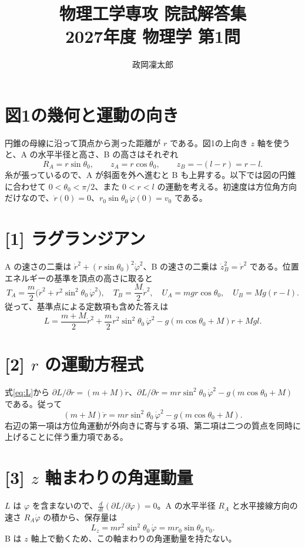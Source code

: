 \documentclass[11pt,a4paper]{article}
\title{物理工学専攻 院試解答集\\2027年度 物理学 第1問}
\author{政岡凜太郎}
\date{}
\begin{document}
\maketitle

\section*{図1の幾何と運動の向き}
円錐の母線に沿って頂点から測った距離が $r$ である。図1の上向き $z$ 軸を使うと、A の水平半径と高さ、B の高さはそれぞれ
\begin{equation}
 R_A=r\sin\theta_0,\qquad z_A=r\cos\theta_0,\qquad
 z_B=-(l-r)=r-l. \label{eq:geometry}
\end{equation}
糸が張っているので、A が斜面を外へ進むと B も上昇する。以下では図の円錐に合わせて $0<\theta_0<\pi/2$、また $0<r<l$ の運動を考える。初速度は方位角方向だけなので、$\dot r(0)=0$、$r_0\sin\theta_0\,\dot\varphi(0)=v_0$ である。

\section*{[1] ラグランジアン}
A の速さの二乗は $\dot r^{2}+(r\sin\theta_0)^2\dot\varphi^{2}$、B の速さの二乗は $\dot z_B^{2}=\dot r^{2}$ である。位置エネルギーの基準を頂点の高さに取ると
\[
 T_A=\frac m2\bigl(\dot r^{2}+r^2\sin^2\theta_0\,\dot\varphi^{2}\bigr),\quad
 T_B=\frac M2\dot r^{2},\quad
 U_A=mg r\cos\theta_0,\quad U_B=Mg(r-l).
\]
従って、基準点による定数項も含めた答えは
\begin{equation}
 \boxed{L=\frac{m+M}{2}\dot r^{2}
 +\frac m2r^2\sin^2\theta_0\,\dot\varphi^{2}
 -g(m\cos\theta_0+M)r+Mgl.} \label{eq:L}
\end{equation}

\section*{[2] $r$ の運動方程式}
式\eqref{eq:L}から $\partial L/\partial\dot r=(m+M)\dot r$、$\partial L/\partial r=mr\sin^2\theta_0\,\dot\varphi^{2}-g(m\cos\theta_0+M)$ である。従って
\begin{equation}
 \boxed{(m+M)\ddot r=mr\sin^2\theta_0\,\dot\varphi^{2}
 -g(m\cos\theta_0+M).} \label{eq:radial}
\end{equation}
右辺の第一項は方位角運動が外向きに寄与する項、第二項は二つの質点を同時に上げることに伴う重力項である。

\section*{[3] $z$ 軸まわりの角運動量}
$L$ は $\varphi$ を含まないので、$\frac{d}{dt}(\partial L/\partial\dot\varphi)=0$。A の水平半径 $R_A$ と水平接線方向の速さ $R_A\dot\varphi$ の積から、保存量は
\begin{equation}
 L_z=mr^2\sin^2\theta_0\,\dot\varphi
 =mr_0\sin\theta_0\,v_0. \label{eq:Lz}
\end{equation}
B は $z$ 軸上で動くため、この軸まわりの角運動量を持たない。
\end{document}
